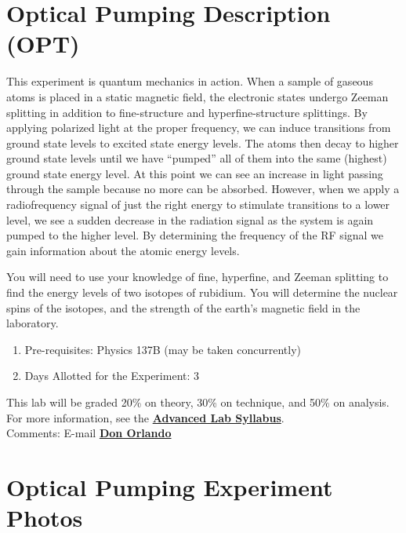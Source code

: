 \documentclass{../lab}
\begin{document}
\maketitle

\tableofcontents

\newpage

\section{Optical Pumping Description (OPT)}

This experiment is quantum mechanics in action. When a sample of gaseous atoms is placed in a static magnetic field, the electronic states undergo Zeeman splitting in addition to fine-structure and hyperfine-structure splittings. By applying polarized light at the proper frequency, we can induce transitions from ground state levels to excited state energy levels. The atoms then decay to higher ground state levels until we have ``pumped'' all of them into the same (highest) ground state energy level. At this point we can see an increase in light passing through the sample because no more can be absorbed. However, when we apply a radiofrequency signal of just the right energy to stimulate transitions to a lower level, we see a sudden decrease in the radiation signal as the system is again pumped to the higher level. By determining the frequency of the RF signal we gain information about the atomic energy levels.

You will need to use your knowledge of fine, hyperfine, and Zeeman splitting to find the energy levels of two isotopes of rubidium. You will determine the nuclear spins of the isotopes, and the strength of the earth's magnetic field in the laboratory.
\begin{enumerate}
    \item Pre-requisites: Physics 137B (may be taken concurrently)

    \item Days Allotted for the Experiment: 3

\end{enumerate}

This lab will be graded 20\% on theory, 30\% on technique, and 50\% on analysis. For more information, see the \href{\AdvancedLabSyllabus}{\textbf{Advanced Lab Syllabus}}. \\

Comments: E-mail \href{\MailDonOrlando}{\textbf{Don Orlando}}

\section{Optical Pumping Experiment Photos}
\end{document}
